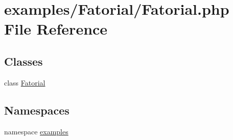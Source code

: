 \hypertarget{_fatorial_8php}{
\section{examples/Fatorial/Fatorial.php File Reference}
\label{_fatorial_8php}
}
\subsection*{Classes}
\begin{CompactItemize}
\item 
class \hyperlink{class_fatorial}{Fatorial}
\end{CompactItemize}
\subsection*{Namespaces}
\begin{CompactItemize}
\item 
namespace \hyperlink{namespaceexamples}{examples}
\end{CompactItemize}
